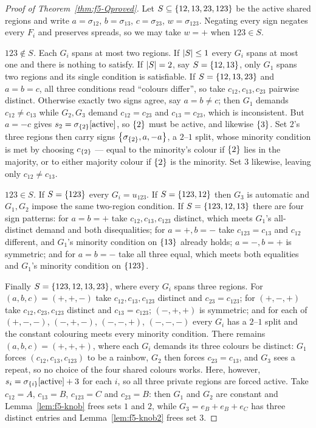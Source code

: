 \begin{proof}[Proof of Theorem~\ref{thm:f5-Qproved}]
Let $S \subseteq \left\{12,13,23,123\right\}$ be the active shared regions and write
$a = \sigma_{12}$, $b = \sigma_{13}$, $c = \sigma_{23}$, $w = \sigma_{123}$.
Negating every sign negates every $F_i$ and preserves spreads, so we may take
$w = +$ when $123 \in S$.

\emph{$123 \notin S$.} Each $G_i$ spans at most two regions. If $\left\lvert S\right\rvert \le 1$
every $G_i$ spans at most one and there is nothing to satisfy. If $\left\lvert S\right\rvert = 2$,
say $S = \left\{12,13\right\}$, only $G_1$ spans two regions and its single condition is
satisfiable. If $S = \left\{12,13,23\right\}$ and $a = b = c$, all three conditions read
``colours differ'', so take $c_{12},c_{13},c_{23}$ pairwise distinct. Otherwise
exactly two signs agree, say $a = b \ne c$; then $G_1$ demands
$c_{12} \ne c_{13}$ while $G_2,G_3$ demand $c_{12} = c_{23}$ and
$c_{13} = c_{23}$, which is inconsistent. But $a = -c$ gives
$s_2 = \sigma_{\left\{2\right\}}[\text{active}]$, so $\left\{2\right\}$ must be active, and
likewise $\left\{3\right\}$. Set $2$'s three regions then carry signs
$\left\{\sigma_{\left\{2\right\}}, a, -a\right\}$, a $2$--$1$ split, whose minority condition is
met by choosing $c_{\left\{2\right\}}$ --- equal to the minority's colour if $\left\{2\right\}$
lies in the majority, or to either majority colour if $\left\{2\right\}$ is the minority.
Set $3$ likewise, leaving only $c_{12} \ne c_{13}$.

\emph{$123 \in S$.} If $S = \left\{123\right\}$ every $G_i = u_{123}$. If
$S = \left\{123,12\right\}$ then $G_3$ is automatic and $G_1, G_2$ impose the same
two-region condition. If $S = \left\{123,12,13\right\}$ there are four sign patterns: for
$a = b = +$ take $c_{12},c_{13},c_{123}$ distinct, which meets $G_1$'s
all-distinct demand and both disequalities; for $a = +, b = -$ take
$c_{123} = c_{13}$ and $c_{12}$ different, and $G_1$'s minority condition on
$\left\{13\right\}$ already holds; $a = -, b = +$ is symmetric; and for $a = b = -$ take
all three equal, which meets both equalities and $G_1$'s minority condition on
$\left\{123\right\}$.

Finally $S = \left\{123,12,13,23\right\}$, where every $G_i$ spans three regions. For
$(a,b,c) = (+,+,-)$ take $c_{12},c_{13},c_{123}$ distinct and $c_{23} = c_{123}$;
for $(+,-,+)$ take $c_{12},c_{23},c_{123}$ distinct and $c_{13} = c_{123}$;
$(-,+,+)$ is symmetric; and for each of $(+,-,-)$, $(-,+,-)$, $(-,-,+)$,
$(-,-,-)$ every $G_i$ has a $2$--$1$ split and the constant colouring meets every
minority condition. There remains $(a,b,c) = (+,+,+)$, where each $G_i$ demands
its three colours be distinct: $G_1$ forces $(c_{12},c_{13},c_{123})$ to be a
rainbow, $G_2$ then forces $c_{23} = c_{13}$, and $G_3$ sees a repeat, so no
choice of the four shared colours works. Here, however,
$s_i = \sigma_{\left\{i\right\}}[\text{active}] + 3$ for each $i$, so all three private
regions are forced active. Take $c_{12} = A$, $c_{13} = B$, $c_{123} = C$ and
$c_{23} = B$: then $G_1$ and $G_2$ are constant and Lemma~\ref{lem:f5-knob}
frees sets $1$ and $2$, while $G_3 = e_B + e_B + e_C$ has three distinct entries
and Lemma~\ref{lem:f5-knob2} frees set $3$.
\end{proof}

